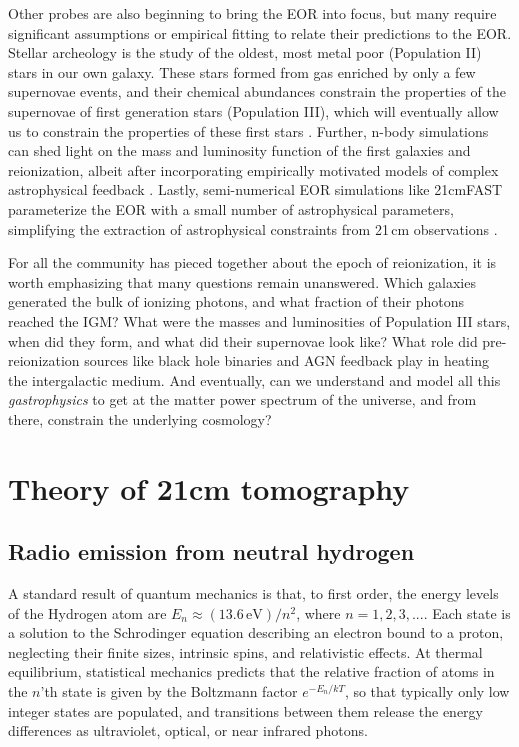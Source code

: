 Other probes are also beginning to bring the EOR into focus, but many require significant assumptions or empirical fitting to relate their predictions to the EOR. Stellar archeology is the study of the oldest, most metal poor (Population II) stars in our own galaxy. These stars formed from gas enriched by only a few supernovae events, and their chemical abundances constrain the properties of the supernovae of first generation stars (Population III), which will eventually allow us to constrain the properties of these first stars \citep{Frebel2015}. Further, n-body simulations can shed light on the mass and luminosity function of the first galaxies and reionization, albeit after incorporating empirically motivated models of complex astrophysical feedback \citep{Bauer2015,Vogelsberger2014} . Lastly, semi-numerical EOR simulations like 21cmFAST \citep{21cmfast} parameterize the EOR with a small number of astrophysical parameters, simplifying the extraction of astrophysical constraints from 21\,cm observations \citep{PoberNextGen,PoberPAPER64Heating}. 

For all the community has pieced together about the epoch of reionization, it is worth emphasizing that many questions remain unanswered. Which galaxies generated the bulk of ionizing photons, and what fraction of their photons reached the IGM? What were the masses and luminosities of Population III stars, when did they form, and what did their supernovae look like? What role did pre-reionization sources like black hole binaries and AGN feedback play in heating the intergalactic medium. And eventually, can we understand and model all this \textit{gastrophysics} to get at the matter power spectrum of the universe, and from there, constrain the underlying cosmology?

\section{Theory of 21cm tomography}
\label{sec:intro21cmsection}

\subsection{Radio emission from neutral hydrogen}

A standard result of quantum mechanics \citep[e.g.,][]{griffithsqm} is that, to first order, the energy levels of the Hydrogen atom are $E_n\approx(13.6\,\text{eV})/n^2$, where $n=1,2,3,...$. Each state is a solution to the Schrodinger equation describing an electron bound to a proton, neglecting their finite sizes, intrinsic spins, and relativistic effects. At thermal equilibrium, statistical mechanics predicts that the relative fraction of atoms in the $n$'th state is given by the Boltzmann factor $e^{-E_n/kT}$, so that typically only low integer states are populated, and transitions between them release the energy differences as ultraviolet, optical, or near infrared photons. 

